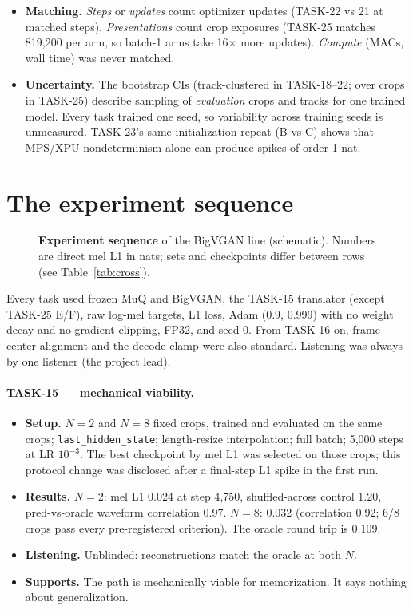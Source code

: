 \documentclass[10pt,letterpaper]{article}
\begin{document}
\begin{itemize}
\item \textbf{Matching.} \emph{Steps} or \emph{updates} count optimizer updates (TASK-22 vs 21 at matched steps). \emph{Presentations} count crop exposures (TASK-25 matches 819{,}200 per arm, so batch-1 arms take 16$\times$ more updates). \emph{Compute} (MACs, wall time) was never matched.
\item \textbf{Uncertainty.} The bootstrap CIs (track-clustered in TASK-18--22; over crops in TASK-25) describe sampling of \emph{evaluation} crops and tracks for one trained model. Every task trained one seed, so variability across training seeds is unmeasured. TASK-23's same-initialization repeat (B vs C) shows that MPS/XPU nondeterminism alone can produce spikes of order 1 nat.
\end{itemize}

\section{The experiment sequence}
\label{sec:sequence}
\begin{figure}[t]
\centering
\resizebox{\textwidth}{!}{}
\caption{\textbf{Experiment sequence} of the BigVGAN line (schematic). Numbers are direct mel L1 in nats; sets and checkpoints differ between rows (see Table~\ref{tab:cross}).}
\label{fig:timeline}
\end{figure}

Every task used frozen MuQ and BigVGAN, the TASK-15 translator (except TASK-25 E/F), raw log-mel targets, L1 loss, Adam (0.9, 0.999) with no weight decay and no gradient clipping, FP32, and seed 0. From TASK-16 on, frame-center alignment and the decode clamp were also standard. Listening was always by one listener (the project lead).

\paragraph{TASK-15 --- mechanical viability.}
\begin{itemize}
\item \textbf{Setup.} $N{=}2$ and $N{=}8$ fixed crops, trained and evaluated on the same crops; \texttt{last\_hidden\_state}; length-resize interpolation; full batch; 5{,}000 steps at LR $10^{-3}$. The best checkpoint by mel L1 was selected on those crops; this protocol change was disclosed after a final-step L1 spike in the first run.
\item \textbf{Results.} $N{=}2$: mel L1 0.024 at step 4{,}750, shuffled-across control 1.20, pred-vs-oracle waveform correlation 0.97. $N{=}8$: 0.032 (correlation 0.92; 6/8 crops pass every pre-registered criterion). The oracle round trip is 0.109.
\item \textbf{Listening.} Unblinded: reconstructions match the oracle at both $N$.
\item \textbf{Supports.} The path is mechanically viable for memorization. It says nothing about generalization.
\end{itemize}
\end{document}
